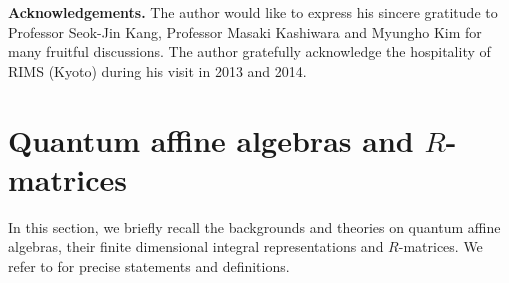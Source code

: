 \documentclass[11pt, leqno]{amsart}
\theoremstyle{definition}
\numberwithin{equation}{section}
\begin{document}
\bigskip

\noindent
{\bf Acknowledgements.} The author would like to express his sincere gratitude to
Professor Seok-Jin Kang, Professor Masaki Kashiwara and Myungho Kim for many fruitful discussions.
The author gratefully acknowledge the hospitality of RIMS (Kyoto) during his visit in 2013 and 2014.

\section{Quantum affine algebras and $R$-matrices}
In this section, we briefly recall the backgrounds and theories on quantum affine algebras, their finite dimensional integral representations and $R$-matrices.
We refer to \cite{AK,KKK13a,Kas02} for precise statements and definitions.
\end{document}
